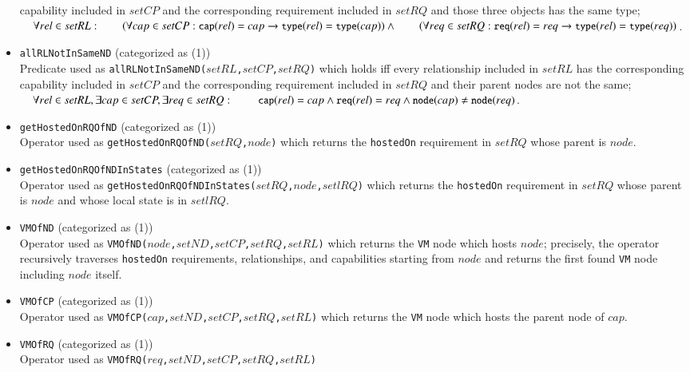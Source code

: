 \documentclass[12pt]{report}
\newcommand{\ra}{\rightarrow}
\newcommand{\mbstt}[1]{\mbox{\small{\tt {#1}}}}
\newcommand{\stt}[1]{{\small{\tt {#1}}}}
\begin{document}
\begin{itemize}
  capability included in $setCP$ and the corresponding requirement
  included in $setRQ$ and those three objects has the same type;\\ 
  $~~~~\forall rel\in setRL:\\
  ~~~~~~~~(\forall cap\in setCP:\mbstt{cap}(rel)=cap\ra\mbstt{type}(rel)=\mbstt{type}(cap))\land\\
  ~~~~~~~~(\forall req\in setRQ:\mbstt{req}(rel)=req\ra\mbstt{type}(rel)=\mbstt{type}(req))$.
\item \stt{allRLNotInSameND} (categorized as (1))\\ 
  Predicate used as
  \stt{allRLNotInSameND($setRL$,$setCP$,$setRQ$)} which holds iff
  every relationship included in $setRL$ has the corresponding
  capability included in $setCP$ and the corresponding requirement
  included in $setRQ$ and their parent nodes are not the same;\\ 
  $~~~~\forall rel\in setRL, \exists cap\in setCP, \exists req\in setRQ:\\
  ~~~~~~~~~\mbstt{cap}(rel)=cap\land\mbstt{req}(rel)=req\land
  \mbstt{node}(cap)\ne\mbstt{node}(req)$.
\item \stt{getHostedOnRQOfND} (categorized as (1))\\
 Operator used as \stt{getHostedOnRQOfND($setRQ$,$node$)} which returns
 the {\tt hostedOn} requirement in $setRQ$ whose parent is $node$.
\item \stt{getHostedOnRQOfNDInStates} (categorized as (1))\\
 Operator used as
 \stt{getHostedOnRQOfNDInStates($setRQ$,$node$,$setlRQ$)} which
 returns the {\tt hostedOn} requirement in $setRQ$ whose parent is
 $node$ and whose local state is in $setlRQ$.
\item \stt{VMOfND} (categorized as (1))\\
 Operator used as \stt{VMOfND($node$,$setND$,$setCP$,$setRQ$,$setRL$)}
 which returns the {\tt VM} node which hosts $node$; precisely, the
 operator recursively traverses {\tt hostedOn} requirements,
 relationships, and capabilities starting from $node$ and returns the
 first found {\tt VM} node including $node$ itself.
\item \stt{VMOfCP} (categorized as (1))\\
 Operator used as \stt{VMOfCP($cap$,$setND$,$setCP$,$setRQ$,$setRL$)}
 which returns the {\tt VM} node which hosts the parent node of $cap$.
\item \stt{VMOfRQ} (categorized as (1))\\
 Operator used as \stt{VMOfRQ($req$,$setND$,$setCP$,$setRQ$,$setRL$)}

\end{itemize}
\end{document}
